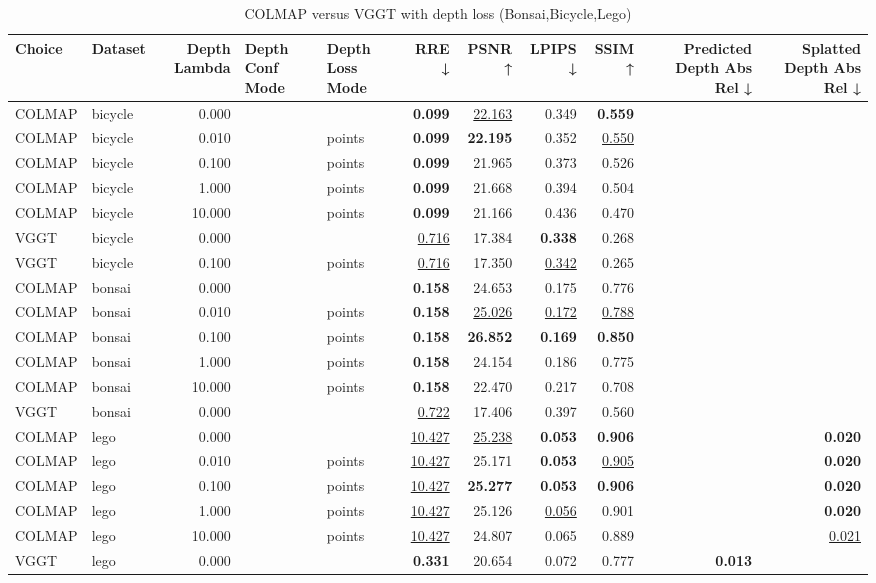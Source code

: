\begin{table}[H]
\caption{COLMAP versus VGGT with depth loss (Bonsai,Bicycle,Lego)}
\label{tab:05_depth_lambda_bonsai,bicycle,lego}
\small
\begin{tabular}{llrllrrrrrr}
\toprule
Choice & Dataset & Depth Lambda & Depth Conf Mode & Depth Loss Mode & RRE ↓ & PSNR ↑ & LPIPS ↓ & SSIM ↑ & Predicted Depth Abs Rel ↓ & Splatted Depth Abs Rel ↓ \\
\midrule
COLMAP & bicycle & 0.000 &  &  & \textbf{0.099} & \underline{22.163} & 0.349 & \textbf{0.559} &  &  \\
COLMAP & bicycle & 0.010 &  & points & \textbf{0.099} & \textbf{22.195} & 0.352 & \underline{0.550} &  &  \\
COLMAP & bicycle & 0.100 &  & points & \textbf{0.099} & 21.965 & 0.373 & 0.526 &  &  \\
COLMAP & bicycle & 1.000 &  & points & \textbf{0.099} & 21.668 & 0.394 & 0.504 &  &  \\
COLMAP & bicycle & 10.000 &  & points & \textbf{0.099} & 21.166 & 0.436 & 0.470 &  &  \\
VGGT & bicycle & 0.000 &  &  & \underline{0.716} & 17.384 & \textbf{0.338} & 0.268 &  &  \\
VGGT & bicycle & 0.100 &  & points & \underline{0.716} & 17.350 & \underline{0.342} & 0.265 &  &  \\
\midrule
COLMAP & bonsai & 0.000 &  &  & \textbf{0.158} & 24.653 & 0.175 & 0.776 &  &  \\
COLMAP & bonsai & 0.010 &  & points & \textbf{0.158} & \underline{25.026} & \underline{0.172} & \underline{0.788} &  &  \\
COLMAP & bonsai & 0.100 &  & points & \textbf{0.158} & \textbf{26.852} & \textbf{0.169} & \textbf{0.850} &  &  \\
COLMAP & bonsai & 1.000 &  & points & \textbf{0.158} & 24.154 & 0.186 & 0.775 &  &  \\
COLMAP & bonsai & 10.000 &  & points & \textbf{0.158} & 22.470 & 0.217 & 0.708 &  &  \\
VGGT & bonsai & 0.000 &  &  & \underline{0.722} & 17.406 & 0.397 & 0.560 &  &  \\
\midrule
COLMAP & lego & 0.000 &  &  & \underline{10.427} & \underline{25.238} & \textbf{0.053} & \textbf{0.906} &  & \textbf{0.020} \\
COLMAP & lego & 0.010 &  & points & \underline{10.427} & 25.171 & \textbf{0.053} & \underline{0.905} &  & \textbf{0.020} \\
COLMAP & lego & 0.100 &  & points & \underline{10.427} & \textbf{25.277} & \textbf{0.053} & \textbf{0.906} &  & \textbf{0.020} \\
COLMAP & lego & 1.000 &  & points & \underline{10.427} & 25.126 & \underline{0.056} & 0.901 &  & \textbf{0.020} \\
COLMAP & lego & 10.000 &  & points & \underline{10.427} & 24.807 & 0.065 & 0.889 &  & \underline{0.021} \\
VGGT & lego & 0.000 &  &  & \textbf{0.331} & 20.654 & 0.072 & 0.777 & \textbf{0.013} &  \\
\bottomrule
\end{tabular}
\end{table}